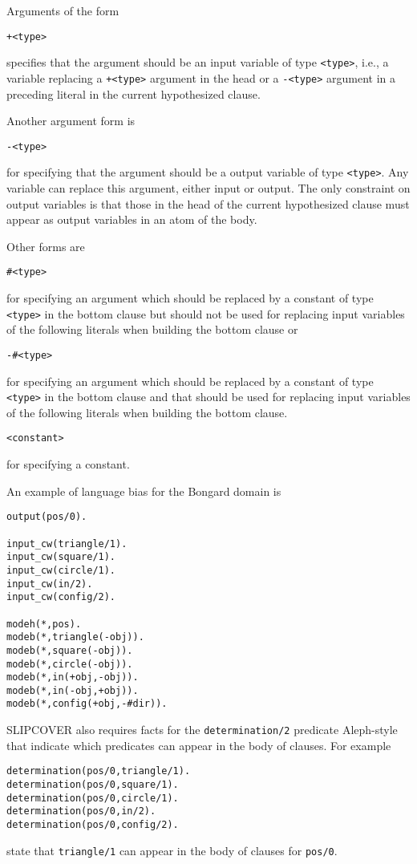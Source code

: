\documentclass[a4paper,10pt]{article}
\begin{document}
Arguments of the form
\begin{verbatim}
+<type>
\end{verbatim}
specifies that the argument should be an input variable of type \texttt{<type>}, i.e., a variable replacing a \texttt{+<type>} argument in the head or a \texttt{-<type>} argument in a preceding literal in the current hypothesized clause.

Another argument form is
\begin{verbatim}
-<type>
\end{verbatim}
for specifying that the argument should be a output variable of type \texttt{<type>}. 
Any variable can replace this argument, either input or output.
The only constraint on output variables is that those in the head of the current hypothesized 
clause must appear as output variables in an atom of the body.

Other forms are
\begin{verbatim}
#<type>
\end{verbatim}
for specifying an argument which should be replaced by a constant of type \texttt{<type>} in the bottom clause but should not be used for replacing input variables of the following literals when building the bottom clause or 
\begin{verbatim}
-#<type>
\end{verbatim}
for specifying an argument which should be replaced by a constant of type \texttt{<type>} in the bottom clause and that should be used for replacing input variables of the following literals when building the bottom clause. 
\begin{verbatim}
<constant>
\end{verbatim}
for specifying a constant.

An example of language bias for the Bongard domain is
\begin{verbatim}
output(pos/0).

input_cw(triangle/1).
input_cw(square/1).
input_cw(circle/1).
input_cw(in/2).
input_cw(config/2).

modeh(*,pos).
modeb(*,triangle(-obj)).
modeb(*,square(-obj)).
modeb(*,circle(-obj)).
modeb(*,in(+obj,-obj)).
modeb(*,in(-obj,+obj)).
modeb(*,config(+obj,-#dir)).
\end{verbatim}
SLIPCOVER also requires facts for the \verb|determination/2| predicate  Aleph-style that indicate which predicates can appear in the body of clauses. 
For example
\begin{verbatim}
determination(pos/0,triangle/1).
determination(pos/0,square/1).
determination(pos/0,circle/1).
determination(pos/0,in/2).
determination(pos/0,config/2).
\end{verbatim}
state that \verb|triangle/1| can appear in the body of clauses for \verb|pos/0|.
\end{document}
